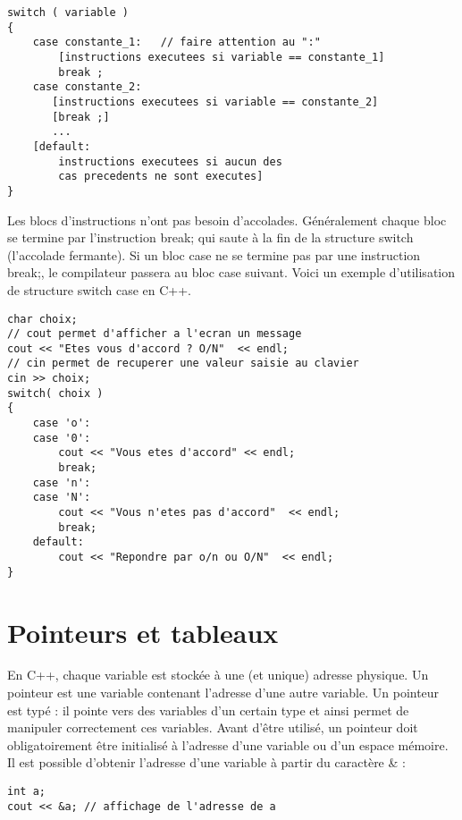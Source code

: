 \documentclass[a4paper, oneside,11pt]{book}
\begin{document}
\begin{lstlisting}
switch ( variable )
{
    case constante_1:   // faire attention au ":"
        [instructions executees si variable == constante_1]
        break ;
    case constante_2:
       [instructions executees si variable == constante_2]
       [break ;]
       ...
    [default:
        instructions executees si aucun des
        cas precedents ne sont executes]
}
\end{lstlisting}

Les blocs d'instructions n'ont pas besoin d'accolades. G\'en\'eralement chaque bloc se termine par
l'instruction break; qui saute \`a la fin de la structure switch (l'accolade fermante). Si un bloc
case ne se termine pas par une instruction break;, le compilateur passera au bloc case suivant.
Voici un exemple d'utilisation de structure switch case en C++.


\begin{lstlisting}
char choix;
// cout permet d'afficher a l'ecran un message
cout << "Etes vous d'accord ? O/N"  << endl;
// cin permet de recuperer une valeur saisie au clavier
cin >> choix;
switch( choix )
{
    case 'o':
    case '0':
        cout << "Vous etes d'accord" << endl;
        break;
    case 'n':
    case 'N':
        cout << "Vous n'etes pas d'accord"  << endl;
        break;
    default:
        cout << "Repondre par o/n ou O/N"  << endl;
}
\end{lstlisting}  






\chapter{Pointeurs et tableaux}
\pagestyle{fancy}
\renewcommand{\chaptermark}[1]{\markboth{#1}{}}
 \rhead{\thepage}



En C++, chaque variable est stock\'ee \`a une (et unique) adresse physique. Un pointeur
est une variable contenant l'adresse d'une autre variable. Un pointeur est typ\'e : il pointe vers des
variables d'un certain type et ainsi permet de manipuler correctement ces variables. Avant d'\^etre
utilis\'e, un pointeur doit obligatoirement \^etre initialis\'e \`a l'adresse d'une variable ou d'un espace
m\'emoire. Il est possible d'obtenir l'adresse d'une variable \`a partir du caract\`ere \& :


\begin{lstlisting}
int a;
cout << &a; // affichage de l'adresse de a
\end{lstlisting}
\end{document}
